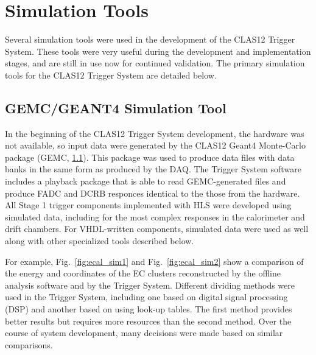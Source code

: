 \section{Simulation Tools}

Several simulation tools were used in the development of the CLAS12 Trigger System. These tools were very useful during the development and implementation stages, and are still in use now for continued validation. The primary simulation tools for the CLAS12 Trigger System are detailed below.


\subsection{GEMC/GEANT4 Simulation Tool}

In the beginning of the CLAS12 Trigger System development, the hardware was not available, so input data were generated by the CLAS12 Geant4 Monte-Carlo package (GEMC, \ref{}). This package was used to produce data files with data banks in the same form as produced by the DAQ. The Trigger System software includes a playback package that is able to read GEMC-generated files and produce FADC and DCRB responces identical to the those from the hardware. All Stage 1 trigger components implemented with HLS were developed using simulated data, including for the most complex responses in the calorimeter and drift chambers. For VHDL-written components, simulated data were used as well along with other specialized tools described below.

For example, Fig.~\ref{fig:ecal_sim1} and Fig.~\ref{fig:ecal_sim2} show a comparison of the energy and coordinates of the EC clusters reconstructed by the offline analysis software and by the Trigger System. Different dividing methods were used in the Trigger System, including one based on digital signal processing (DSP) and another based on using look-up tables. The first method provides better results but requires more resources than the second method. Over the course of system development, many decisions were made based on similar comparisons.

